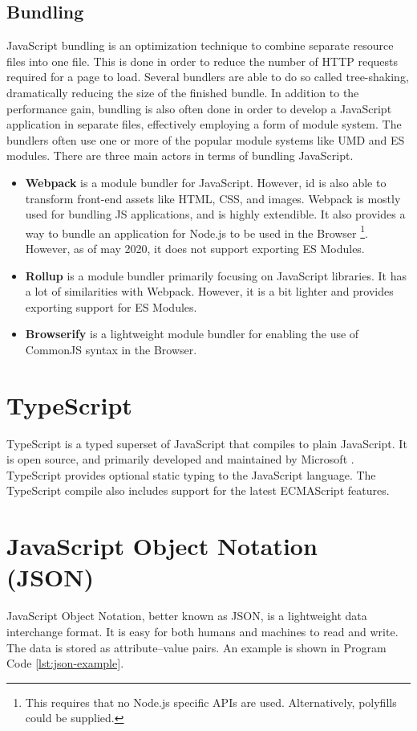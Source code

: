 \subsection{Bundling}
\label{sec:intro-bundling}
JavaScript bundling is an optimization technique to combine separate resource files into one file. This is done in order to reduce the number of HTTP requests required for a page to load. Several bundlers are able to do so called tree-shaking, dramatically reducing the size of the finished bundle. In addition to the performance gain, bundling is also often done in order to develop a JavaScript application in separate files, effectively employing a form of module system. The bundlers often use one or more of the popular module systems like UMD and ES modules. There are three main actors in terms of bundling JavaScript.
\begin{itemize}
    \item \textbf{Webpack} \cite{webpack} is a module bundler for JavaScript. However, id is also able to transform front-end assets like HTML, CSS, and images. Webpack is mostly used for bundling JS applications, and is highly extendible. It also provides a way to bundle an application for Node.js to be used in the Browser \footnote{This requires that no Node.js specific APIs are used. Alternatively, polyfills could be supplied.}. However, as of may 2020, it does not support exporting ES Modules.
    \item \textbf{Rollup} \cite{rollup} is a module bundler primarily focusing on JavaScript libraries. It has a lot of similarities with Webpack. However, it is a bit lighter and provides exporting support for ES Modules.
    \item \textbf{Browserify} \cite{browserify} is a lightweight module bundler for enabling the use of CommonJS syntax in the Browser.
\end{itemize}

\section{TypeScript}
TypeScript \cite{typescript} is a typed superset of JavaScript that compiles to plain JavaScript. It is open source, and primarily developed and maintained by Microsoft \cite{microsoft}. TypeScript provides optional static typing to the JavaScript language. The TypeScript compile also includes support for the latest ECMAScript features.

\section{JavaScript Object Notation (JSON)}
JavaScript Object Notation, better known as JSON, is a lightweight data interchange format. It is easy for both humans and machines to read and write. The data is stored as attribute–value pairs. An example is shown in Program Code \ref{lst:json-example}.


